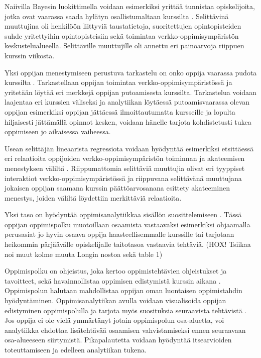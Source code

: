 Naiivilla Bayesin luokittimella voidaan esimerkiksi yrittää tunnistaa opiskelijoita, jotka ovat vaarassa saada hylätyn osallistumaltaan kurssilta \citep{barberCourseCorrectionUsing2012}. Selittävinä muuttujina oli henkilöön liittyviä taustatietoja, suoritettujen opintopisteiden suhde yritettyihin opintopisteisiin sekä toimintaa verkko-oppimisympäristön keskustelualueella. Selittäville muuttujille oli annettu eri painoarvoja riippuen kurssin viikosta.

Yksi oppijan menestymiseen perustuva tarkastelu on onko oppija vaarassa pudota kurssilta \citep{oliveSupervisedLearningFramework2018, suhonenUsingMoodleData2019}. Tarkastellaan oppijan toimintaa verkko-oppimisympäristössä ja yritetään löytää eri merkkejä oppijan putoamisesta kurssilta. Tarkastelua voidaan laajentaa eri kurssien väliseksi \citep{kinnari-korpelaOppimisanalytiikallaTehokkaampaanOhjaukseen2020} ja analytiikan löytäessä putoamisvaarassa olevan oppijan esimerkiksi oppijan jättäessä ilmoittautumatta kursseille ja lopulta hiljaisesti jättämällä opinnot kesken, voidaan hänelle tarjota kohdistetusti tukea oppimiseen jo aikaisessa vaiheessa.

Usean selittäjän lineaarista regressiota voidaan hyödyntää esimerkiksi etsittäessä eri relaatioita oppijoiden verkko-oppimisympäristön toiminnan ja akateemisen menestyksen väliltä \citep{agudo-peregrinaCanWePredict2014}. Riippumattomia selittäviä muuttujia olivat eri tyyppiset interaktiot verkko-oppimisympäristössä ja riippuvana selittävänä muuttujana jokaisen oppijan saamana kurssin päättöarvosanana esittety akateeminen menestys, joiden väliltä löydettiin merkittäviä relaatioita.


Yksi taso on hyödyntää oppimisanalytiikkaa sisällön suosittelemiseen \citep{longPenetratingFogAnalytics2011,siemensLearningAnalyticsEmergence2013}. Tässä oppijan oppimispolku muotoillaan osaamista vastaavaksi esimerkiksi ohjaamalla perusasiat jo hyvin osaava oppija haasteellisemmalle kurssille tai tarjotaan heikommin pärjäävälle opiskelijalle taitotasoa vastaavia tehtäviä. \color{red}(HOX! Tsiikaa noi muut kolme muuta Longin nostoa sekä table 1)\color{black}

Oppimispolku on ohjeistus, joka kertoo oppimistehtävien ohjeistukset ja tavoitteet, sekä havainnollistaa oppimisen edistymistä kurssin aikana \citep{toivolaFlippedLearningKaanteinen2017}. Oppimispolun halutaan mahdollistaa oppijan oman luontaisen oppimistahdin hyödyntäminen. Oppimisanalytiikan avulla voidaan visualisoida oppijan edistyminen oppimispolulla ja tarjota myös suosituksia seuraavista tehtävistä \citep{longPenetratingFogAnalytics2011}. Jos oppija ei ole vielä ymmärtänyt jotain oppimispolun osa-aluetta, voi analytiikka ehdottaa lisätehtävää osaamisen vahvistamiseksi ennen seuraavaan osa-alueeseen siirtymistä. Pikapalautetta voidaan hyödyntää itsearvioiden toteuttamiseen ja edelleen analytiikan tukena.


